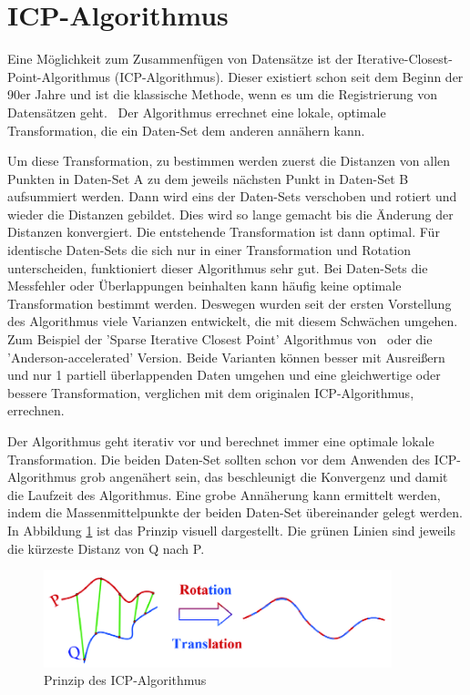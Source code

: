 \section{ICP-Algorithmus} \label{icp}

Eine Möglichkeit zum Zusammenfügen von Datensätze ist der 
Iterative-Closest-Point-Algorithmus (ICP-Algorithmus).
Dieser existiert schon seit dem Beginn der 90er Jahre und ist 
die klassische Methode, wenn es um die Registrierung von Datensätzen geht.~\cite{icp}
Der Algorithmus errechnet eine lokale, optimale Transformation, die ein Daten-Set
dem anderen annähern kann. \cite{icp_og}

Um diese Transformation, zu bestimmen werden zuerst die Distanzen von allen 
Punkten in Daten-Set A zu dem jeweils nächsten Punkt in Daten-Set B aufsummiert 
werden. Dann wird eins der Daten-Sets verschoben und rotiert und wieder die 
Distanzen gebildet. Dies wird so lange gemacht bis die Änderung der Distanzen 
konvergiert. Die entstehende Transformation ist dann optimal.
Für identische Daten-Sets die sich nur in einer Transformation und Rotation 
unterscheiden, funktioniert dieser Algorithmus sehr gut. Bei Daten-Sets die 
Messfehler oder Überlappungen beinhalten kann häufig keine optimale 
Transformation bestimmt werden.
Deswegen wurden seit der ersten Vorstellung des Algorithmus viele Varianzen
entwickelt, die mit diesem Schwächen umgehen. 
Zum Beispiel der 'Sparse Iterative Closest Point' Algorithmus von~\cite{Bouaziz.2013}
oder die 'Anderson-accelerated' Version.
Beide Varianten können besser mit Ausreißern und nur 1
partiell überlappenden Daten umgehen und eine gleichwertige oder bessere 
Transformation, verglichen mit dem originalen ICP-Algorithmus, errechnen.\ \cite{icp}

Der Algorithmus geht iterativ vor und berechnet immer eine optimale lokale Transformation.
Die beiden Daten-Set sollten schon vor dem Anwenden des ICP-Algorithmus grob angenähert sein, 
das beschleunigt die Konvergenz und damit die Laufzeit des Algorithmus.
Eine grobe Annäherung kann ermittelt werden, indem die Massenmittelpunkte der beiden Daten-Set
übereinander gelegt werden. In Abbildung \ref{fig:ipc_princip} ist das Prinzip visuell 
dargestellt. Die grünen Linien sind jeweils die kürzeste Distanz von Q nach P. 

\begin{figure}[H]
    \centering
    \includegraphics[width=0.9\textwidth]{images/Principle-of-ICP-algorithm.png}
    \caption{Prinzip des ICP-Algorithmus~\cite{icp_img}}
    \label{fig:ipc_princip}
\end{figure}

